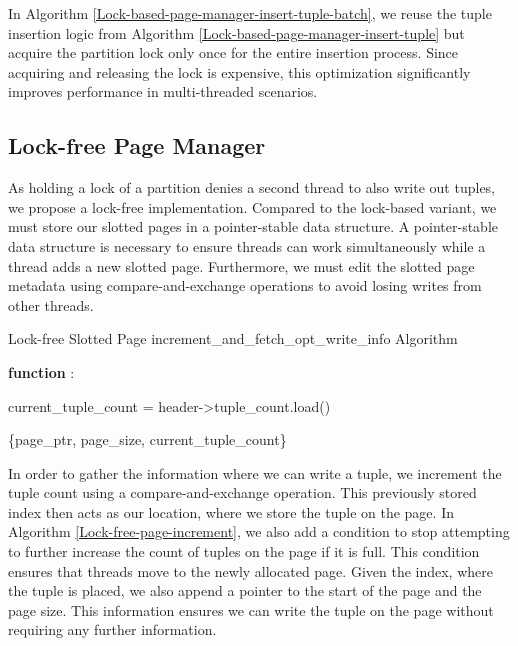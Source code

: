 In Algorithm \ref{Lock-based-page-manager-insert-tuple-batch}, we reuse the tuple insertion logic from Algorithm \ref{Lock-based-page-manager-insert-tuple} but acquire the partition lock only once for the entire insertion process.
Since acquiring and releasing the lock is expensive, this optimization significantly improves performance in multi-threaded scenarios.

\subsection{Lock-free Page Manager}
As holding a lock of a partition denies a second thread to also write out tuples, we propose a lock-free implementation.
Compared to the lock-based variant, we must store our slotted pages in a pointer-stable data structure.
A pointer-stable data structure is necessary to ensure threads can work simultaneously while a thread adds a new slotted page.
Furthermore, we must edit the slotted page metadata using compare-and-exchange operations to avoid losing writes from other threads.

\begin{algorithm}[h]
  \caption{Lock-free Slotted Page increment\_and\_fetch\_opt\_write\_info Algorithm}
  \label{Lock-free-page-increment}

  \textbf{function} \Increment{}:

  current\_tuple\_count = header->tuple\_count.load()


  \Return \{page\_ptr, page\_size, current\_tuple\_count\}
\end{algorithm}
In order to gather the information where we can write a tuple, we increment the tuple count using a compare-and-exchange operation.
This previously stored index then acts as our location, where we store the tuple on the page.
In Algorithm \ref{Lock-free-page-increment}, we also add a condition to stop attempting to further increase the count of tuples on the page if it is full.
This condition ensures that threads move to the newly allocated page.
Given the index, where the tuple is placed, we also append a pointer to the start of the page and the page size.
This information ensures we can write the tuple on the page without requiring any further information.

